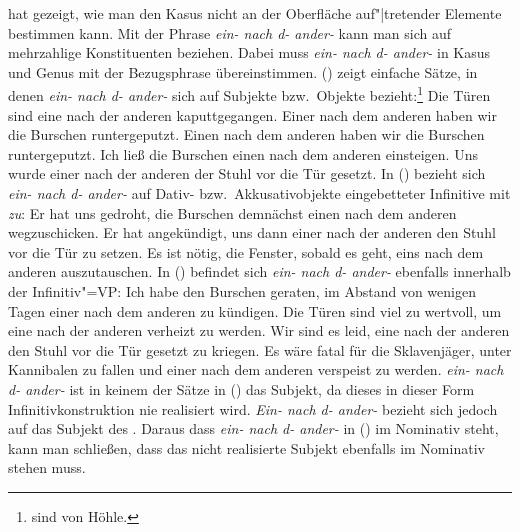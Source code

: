 \citet*[Kapitel~6]{Hoehle83a}
hat gezeigt, wie man den Kasus nicht an der Oberfläche
auf"|tretender Elemente bestimmen kann. Mit der Phrase \emph{ein- nach d- ander-} kann
man sich auf mehrzahlige Konstituenten beziehen. Dabei muss \emph{ein- nach d- ander-}
in Kasus und Genus mit der Bezugsphrase übereinstimmen.
() zeigt einfache Sätze, in denen \emph{ein- nach d- ander-} sich auf Subjekte bzw.\
Objekte bezieht:\footnote{
         sind von Höhle.
}
\eal
\label{bsp-tueren-hoehle}
\ex Die Türen sind eine nach der anderen kaputtgegangen.
\ex Einer nach dem anderen haben wir die Burschen runtergeputzt.
\ex Einen nach dem anderen haben wir die Burschen runtergeputzt.
\ex Ich ließ die Burschen einen nach dem anderen einsteigen.
\ex Uns wurde einer nach der anderen der Stuhl vor die Tür gesetzt.
\zl
In () bezieht sich \emph{ein- nach d- ander-} auf Dativ- bzw.\ Akkusativobjekte
eingebetteter Infinitive mit \emph{zu}:
\eal
\ex Er hat uns gedroht, die Burschen demnächst einen nach dem anderen wegzuschicken.
\ex Er hat angekündigt, uns dann einer nach der anderen den Stuhl vor die Tür zu setzen.
\ex Es ist nötig, die Fenster, sobald es geht, eins nach dem anderen auszutauschen.
\zl
In () befindet sich \emph{ein- nach d- ander-} ebenfalls innerhalb der Infinitiv"=VP:
\eal
\label{bsp-nominativ-inkoh}
\ex Ich habe den Burschen geraten, im Abstand von wenigen Tagen einer nach dem anderen
      zu kündigen.\label{bsp-nominativ-inkoh-geraten}
\ex Die Türen sind viel zu wertvoll, um eine nach der anderen verheizt zu werden.
\ex Wir sind es leid, eine nach der anderen den Stuhl vor die Tür gesetzt zu kriegen.
\ex Es wäre fatal für die Sklavenjäger, unter Kannibalen zu fallen und einer nach dem
      anderen verspeist zu werden.
\zl
\emph{ein- nach d- ander-} ist in keinem der Sätze in () das Subjekt,
da dieses in dieser
Form Infinitivkonstruktion nie realisiert wird. \emph{Ein- nach d- ander-} bezieht sich
jedoch auf das Subjekt des \zuis. Daraus dass \emph{ein- nach d- ander-} in (\mex{0}) im Nominativ
steht, kann man schließen, dass das nicht realisierte Subjekt ebenfalls im Nominativ
stehen muss.

